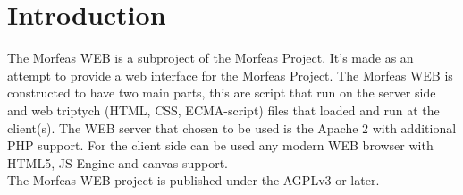 \section{Introduction}
The Morfeas WEB is a subproject of the Morfeas Project. It's made as an attempt to provide a web interface for the Morfeas Project. 
The Morfeas WEB is constructed to have two main parts, this are script that run on the server side and web triptych (HTML, CSS, ECMA-script) files that loaded and run at the client(s). 
The WEB server that chosen to be used is the Apache 2 with additional PHP support. For the client side can be used any modern WEB browser with HTML5, JS Engine and canvas support.\\

The Morfeas WEB project is published under the AGPLv3 or later.